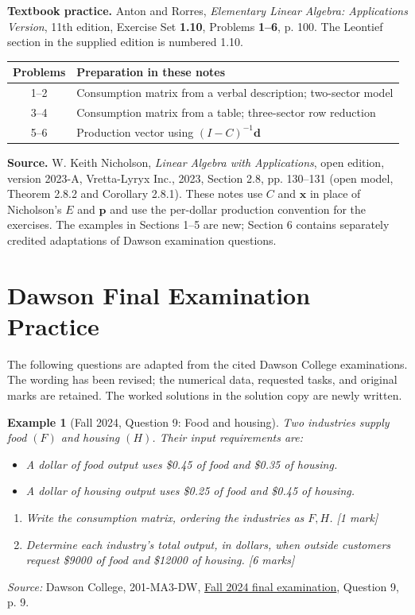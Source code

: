 \documentclass{article}
\theoremstyle{plain}
\newtheorem{example}{Example}[section]
\theoremstyle{definition}
\theoremstyle{remark}
\renewcommand{\vec}[1]{\mathbf{#1}}
\begin{document}
\textbf{Textbook practice.} Anton and Rorres, \emph{Elementary Linear Algebra: Applications Version}, 11th edition, Exercise Set \textbf{1.10}, Problems \textbf{1--6}, p. 100. The Leontief section in the supplied edition is numbered 1.10.
\begin{center}
\renewcommand{\arraystretch}{1.2}
\begin{tabular}{c|l}
Problems & Preparation in these notes\\\hline
1--2 & Consumption matrix from a verbal description; two-sector model\\
3--4 & Consumption matrix from a table; three-sector row reduction\\
5--6 & Production vector using $(I-C)^{-1}\vec{d}$
\end{tabular}
\end{center}
\vfill
{\small\textbf{Source.} W. Keith Nicholson, \emph{Linear Algebra with Applications}, open edition, version 2023-A, Vretta-Lyryx Inc., 2023, Section 2.8, pp. 130--131 (open model, Theorem 2.8.2 and Corollary 2.8.1). These notes use $C$ and $\vec{x}$ in place of Nicholson's $E$ and $\vec{p}$ and use the per-dollar production convention for the exercises. The examples in Sections 1--5 are new; Section 6 contains separately credited adaptations of Dawson examination questions.}

\newpage
\section{Dawson Final Examination Practice}
The following questions are adapted from the cited Dawson College examinations. The wording has been revised; the numerical data, requested tasks, and original marks are retained. The worked solutions in the solution copy are newly written.

\begin{example}[Fall 2024, Question 9: Food and housing]\label{ex:dawsonfall}
Two industries supply food $(F)$ and housing $(H)$. Their input requirements are:
\begin{itemize}
\item A dollar of food output uses \$0.45 of food and \$0.35 of housing.
\item A dollar of housing output uses \$0.25 of food and \$0.45 of housing.
\end{itemize}
\begin{enumerate}
\item[(a)] Write the consumption matrix, ordering the industries as $F,H$. \hfill [1 mark]
\item[(b)] Determine each industry's total output, in dollars, when outside customers request \$9000 of food and \$12000 of housing. \hfill [6 marks]
\end{enumerate}
\end{example}
{\small\textit{Source:} Dawson College, 201-MA3-DW, \href{https://www.dawsoncollege.qc.ca/mathematics/wp-content/uploads/sites/113/Fall-2024-3.pdf}{Fall 2024 final examination}, Question 9, p. 9.}
\end{document}
